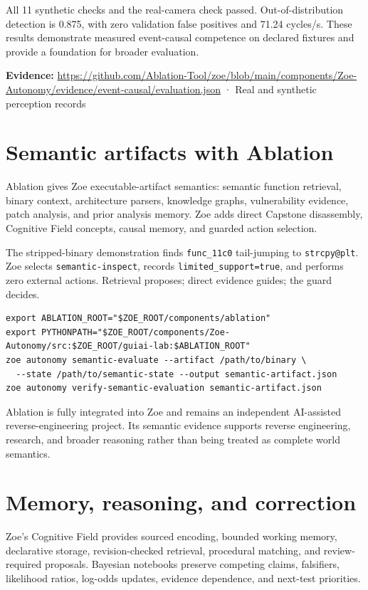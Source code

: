 \documentclass[11pt]{article}
\newcommand{\evidence}[1]{\par\smallskip\small\color{ZoeGray}\textbf{Evidence:} #1\normalsize\par\smallskip}
\begin{document}
All 11 synthetic checks and the real-camera check passed. Out-of-distribution detection is 0.875, with zero validation false positives and 71.24 cycles/s. These results demonstrate measured event-causal competence on declared fixtures and provide a foundation for broader evaluation.

\evidence{\url{https://github.com/Ablation-Tool/zoe/blob/main/components/Zoe-Autonomy/evidence/event-causal/evaluation.json} · Real and synthetic perception records}

\clearpage
\section{Semantic artifacts with Ablation}

Ablation gives Zoe executable-artifact semantics: semantic function retrieval, binary context, architecture parsers, knowledge graphs, vulnerability evidence, patch analysis, and prior analysis memory. Zoe adds direct Capstone disassembly, Cognitive Field concepts, causal memory, and guarded action selection.

The stripped-binary demonstration finds \texttt{func\_11c0} tail-jumping to \texttt{strcpy@plt}. Zoe selects \texttt{semantic-inspect}, records \texttt{limited\_support=true}, and performs zero external actions. Retrieval proposes; direct evidence guides; the guard decides.

\begin{lstlisting}
export ABLATION_ROOT="$ZOE_ROOT/components/ablation"
export PYTHONPATH="$ZOE_ROOT/components/Zoe-Autonomy/src:$ZOE_ROOT/guiai-lab:$ABLATION_ROOT"
zoe autonomy semantic-evaluate --artifact /path/to/binary \
  --state /path/to/semantic-state --output semantic-artifact.json
zoe autonomy verify-semantic-evaluation semantic-artifact.json
\end{lstlisting}

Ablation is fully integrated into Zoe and remains an independent AI-assisted reverse-engineering project. Its semantic evidence supports reverse engineering, research, and broader reasoning rather than being treated as complete world semantics.

\clearpage
\section{Memory, reasoning, and correction}

Zoe's Cognitive Field provides sourced encoding, bounded working memory, declarative storage, revision-checked retrieval, procedural matching, and review-required proposals. Bayesian notebooks preserve competing claims, falsifiers, likelihood ratios, log-odds updates, evidence dependence, and next-test priorities.
\end{document}
